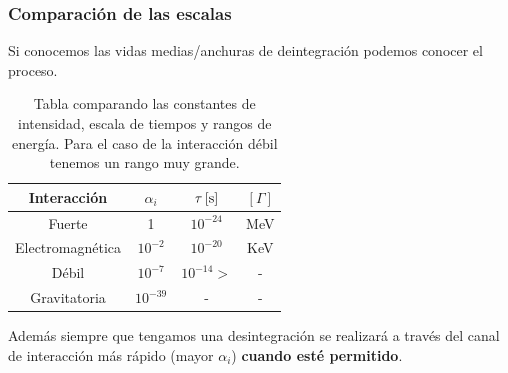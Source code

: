 \subsubsection{Comparación de las escalas}
Si conocemos las vidas medias/anchuras de deintegración podemos conocer el proceso. 
\begin{table}[h]
\centering
\begin{tabular}{|c|ccc|}
\hline
Interacción& $\alpha_i$ & $\unit[\tau]{[s]}$ & $[\Gamma]$ \\ \hline
Fuerte           & 1          & $10^{-24}$       & MeV        \\
Electromagnética & $10^{-2}$  & $10^{-20}$       & KeV        \\
Débil            & $10^{-7}$  & $10^{-14} >$      & -          \\
Gravitatoria     & $10^{-39}$ & -                & -         \\ \hline
\end{tabular}
\caption{Tabla comparando las constantes de intensidad, escala de tiempos y rangos de energía. Para el caso de la interacción débil tenemos un rango muy grande.}
\label{tab: comparacion de escalas}
\end{table}
Además siempre que tengamos una desintegración se realizará a través del canal de interacción más rápido (mayor $\alpha_i$) \textbf{cuando esté permitido}.
